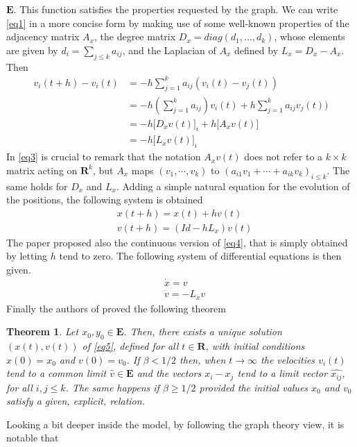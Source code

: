 \documentclass{article} %
\newcounter{math}
\newtheorem{theorem}{Theorem}
\begin{document}
$\mathbf{E}$. This function satisfies the properties requested by the graph.
We can write \eqref{eq1} in a more concise form by making use of some well-known 
properties of the adjacency matrix $A_x$, the degree matrix $D_x=diag(d_1,...,d_k)$, whose
elements are given by $d_i=\sum_{j\leq k}a_{ij}$, and the Laplacian of $A_x$ defined by
$L_x=D_x-A_x$. Then
\begin{align}
\label{eq3}
    v_i(t+h)-v_i(t)& = -h\sum_{j=1}^k a_{ij}(v_i(t)-v_j(t))\\
    & = -h(\sum_{j=1}^k a_{ij})v_i(t)+h\sum_{j=1}^k a_{ij}v_j(t))\nonumber\\
    & = -h\lbrack D_xv(t)\rbrack_i+h\lbrack A_xv(t)\rbrack\nonumber\\
    & = -h\lbrack L_xv(t)\rbrack_i\nonumber
\end{align}
In \eqref{eq3} is crucial to remark that the notation $A_xv(t)$ does not refer to a 
$k \times k$ matrix acting on $\mathbf{R}^k$, but $A_x$ maps $(v_1, \dotsb ,v_k)$ 
to $(a_{i1}v_1+ \dotsb +a_{ik}v_k)_{i\leq k}$. The same holds for $D_x$ and $L_x$.
Adding a simple natural equation for the evolution of the positions, the following
system is obtained
\begin{align}
\label{eq4}
    &x(t+h) = x(t) + hv(t)\\
    &v(t+h) = (Id -hL_x)v(t)\nonumber
\end{align}
The paper \cite{CuckerSmale} proposed also the continuous version of \eqref{eq4}, that
is simply obtained by letting $h$ tend to zero. The following system of differential 
equations is then given.
\begin{align}
\label{eq5}
    &\dot{x} = v\\
    &\dot{v} = -L_xv\nonumber
\end{align}
Finally the authors of \cite{CuckerSmale} proved the following theorem
\begin{theorem}
    Let $x_0,y_0\in \mathbf{E}$. Then, there exists a unique solution $(x(t),v(t))$ of 
    \eqref{eq5}, defined for all $t \in \mathbf{R}$, with initial conditions $x(0)=x_0$ and
    $v(0)=v_0$. If $\beta<1/2$ then, when $t\rightarrow\infty$ the velocities $v_i(t)$ tend
    to a common limit $\widehat{v}\in\mathbf{E}$ and the vectors $x_i-x_j$ tend to a limit 
    vector $\widehat{x_{ij}}$, for all $i,j\leq k$. The same happens if $\beta\geq1/2$ provided
    the initial values $x_0$ and $v_0$ satisfy a given, explicit, relation.
\end{theorem}
Looking a bit deeper inside the model, by following the graph theory view, it is notable that
\end{document}
